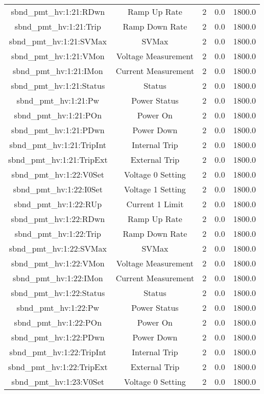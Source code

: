 \begin{center}
\begin{longtable}{c | c c c c }
sbnd\_pmt\_hv:1:21:RDwn & Ramp Up Rate & 2 & 0.0 & 1800.0\\ 
sbnd\_pmt\_hv:1:21:Trip & Ramp Down Rate & 2 & 0.0 & 1800.0\\ 
sbnd\_pmt\_hv:1:21:SVMax & SVMax & 2 & 0.0 & 1800.0\\ 
sbnd\_pmt\_hv:1:21:VMon & Voltage Measurement & 2 & 0.0 & 1800.0\\ 
sbnd\_pmt\_hv:1:21:IMon & Current Measurement & 2 & 0.0 & 1800.0\\ 
sbnd\_pmt\_hv:1:21:Status & Status & 2 & 0.0 & 1800.0\\ 
sbnd\_pmt\_hv:1:21:Pw & Power Status & 2 & 0.0 & 1800.0\\ 
sbnd\_pmt\_hv:1:21:POn & Power On & 2 & 0.0 & 1800.0\\ 
sbnd\_pmt\_hv:1:21:PDwn & Power Down & 2 & 0.0 & 1800.0\\ 
sbnd\_pmt\_hv:1:21:TripInt & Internal Trip & 2 & 0.0 & 1800.0\\ 
sbnd\_pmt\_hv:1:21:TripExt & External Trip & 2 & 0.0 & 1800.0\\ 
sbnd\_pmt\_hv:1:22:V0Set & Voltage 0 Setting & 2 & 0.0 & 1800.0\\ 
sbnd\_pmt\_hv:1:22:I0Set & Voltage 1 Setting & 2 & 0.0 & 1800.0\\ 
sbnd\_pmt\_hv:1:22:RUp & Current 1 Limit & 2 & 0.0 & 1800.0\\ 
sbnd\_pmt\_hv:1:22:RDwn & Ramp Up Rate & 2 & 0.0 & 1800.0\\ 
sbnd\_pmt\_hv:1:22:Trip & Ramp Down Rate & 2 & 0.0 & 1800.0\\ 
sbnd\_pmt\_hv:1:22:SVMax & SVMax & 2 & 0.0 & 1800.0\\ 
sbnd\_pmt\_hv:1:22:VMon & Voltage Measurement & 2 & 0.0 & 1800.0\\ 
sbnd\_pmt\_hv:1:22:IMon & Current Measurement & 2 & 0.0 & 1800.0\\ 
sbnd\_pmt\_hv:1:22:Status & Status & 2 & 0.0 & 1800.0\\ 
sbnd\_pmt\_hv:1:22:Pw & Power Status & 2 & 0.0 & 1800.0\\ 
sbnd\_pmt\_hv:1:22:POn & Power On & 2 & 0.0 & 1800.0\\ 
sbnd\_pmt\_hv:1:22:PDwn & Power Down & 2 & 0.0 & 1800.0\\ 
sbnd\_pmt\_hv:1:22:TripInt & Internal Trip & 2 & 0.0 & 1800.0\\ 
sbnd\_pmt\_hv:1:22:TripExt & External Trip & 2 & 0.0 & 1800.0\\ 
sbnd\_pmt\_hv:1:23:V0Set & Voltage 0 Setting & 2 & 0.0 & 1800.0\\ 

\end{longtable}
\end{center}
